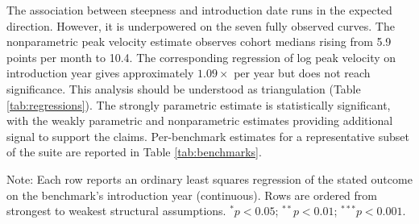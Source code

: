 The association between steepness and introduction date runs in the expected direction. However, it is underpowered on the seven fully observed curves. The nonparametric peak velocity estimate observes cohort medians rising from 5.9 points per month to 10.4. The corresponding regression of log peak velocity on introduction year gives approximately $1.09\times$ per year but does not reach significance. This analysis should be understood as triangulation (Table \ref{tab:regressions}). The strongly parametric estimate is statistically significant, with the weakly parametric and nonparametric estimates providing additional signal to support the claims. Per-benchmark estimates for a representative subset of the suite are reported in Table \ref{tab:benchmarks}.

\begin{table}[t]
\centering
\begin{threeparttable}
\caption{Regression estimates of the change in saturation speed on benchmark introduction date.}
\label{tab:regressions}
\begin{tablenotes}
\footnotesize
\item Note: Each row reports an ordinary least squares regression of the stated outcome on the benchmark's introduction year (continuous). Rows are ordered from strongest to weakest structural assumptions. $^{*}p<0.05$; $^{**}p<0.01$; $^{***}p<0.001$.
\end{tablenotes}
\end{threeparttable}
\end{table}


